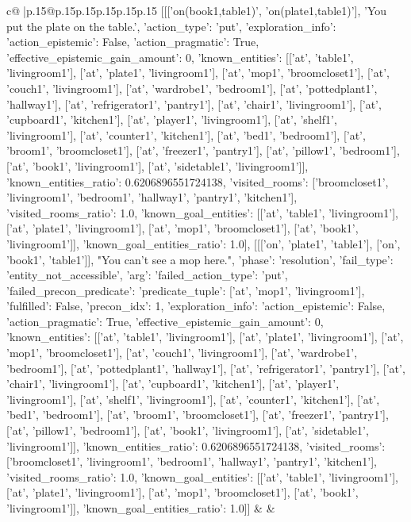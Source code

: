 \documentclass{article}
\begin{document}
{\begin{supertabular}{c@{$\;$}|p{.15\linewidth}@{}p{.15\linewidth}p{.15\linewidth}p{.15\linewidth}p{.15\linewidth}p{.15\linewidth}}
{{{	 [[['on(book1,table1)', 'on(plate1,table1)'], 'You put the plate on the table.', {'action_type': 'put', 'exploration_info': {'action_epistemic': False, 'action_pragmatic': True, 'effective_epistemic_gain_amount': 0, 'known_entities': [['at', 'table1', 'livingroom1'], ['at', 'plate1', 'livingroom1'], ['at', 'mop1', 'broomcloset1'], ['at', 'couch1', 'livingroom1'], ['at', 'wardrobe1', 'bedroom1'], ['at', 'pottedplant1', 'hallway1'], ['at', 'refrigerator1', 'pantry1'], ['at', 'chair1', 'livingroom1'], ['at', 'cupboard1', 'kitchen1'], ['at', 'player1', 'livingroom1'], ['at', 'shelf1', 'livingroom1'], ['at', 'counter1', 'kitchen1'], ['at', 'bed1', 'bedroom1'], ['at', 'broom1', 'broomcloset1'], ['at', 'freezer1', 'pantry1'], ['at', 'pillow1', 'bedroom1'], ['at', 'book1', 'livingroom1'], ['at', 'sidetable1', 'livingroom1']], 'known_entities_ratio': 0.6206896551724138, 'visited_rooms': ['broomcloset1', 'livingroom1', 'bedroom1', 'hallway1', 'pantry1', 'kitchen1'], 'visited_rooms_ratio': 1.0, 'known_goal_entities': [['at', 'table1', 'livingroom1'], ['at', 'plate1', 'livingroom1'], ['at', 'mop1', 'broomcloset1'], ['at', 'book1', 'livingroom1']], 'known_goal_entities_ratio': 1.0}}], [[['on', 'plate1', 'table1'], ['on', 'book1', 'table1']], "You can't see a mop here.", {'phase': 'resolution', 'fail_type': 'entity_not_accessible', 'arg': {'failed_action_type': 'put', 'failed_precon_predicate': {'predicate_tuple': ['at', 'mop1', 'livingroom1'], 'fulfilled': False, 'precon_idx': 1}}, 'exploration_info': {'action_epistemic': False, 'action_pragmatic': True, 'effective_epistemic_gain_amount': 0, 'known_entities': [['at', 'table1', 'livingroom1'], ['at', 'plate1', 'livingroom1'], ['at', 'mop1', 'broomcloset1'], ['at', 'couch1', 'livingroom1'], ['at', 'wardrobe1', 'bedroom1'], ['at', 'pottedplant1', 'hallway1'], ['at', 'refrigerator1', 'pantry1'], ['at', 'chair1', 'livingroom1'], ['at', 'cupboard1', 'kitchen1'], ['at', 'player1', 'livingroom1'], ['at', 'shelf1', 'livingroom1'], ['at', 'counter1', 'kitchen1'], ['at', 'bed1', 'bedroom1'], ['at', 'broom1', 'broomcloset1'], ['at', 'freezer1', 'pantry1'], ['at', 'pillow1', 'bedroom1'], ['at', 'book1', 'livingroom1'], ['at', 'sidetable1', 'livingroom1']], 'known_entities_ratio': 0.6206896551724138, 'visited_rooms': ['broomcloset1', 'livingroom1', 'bedroom1', 'hallway1', 'pantry1', 'kitchen1'], 'visited_rooms_ratio': 1.0, 'known_goal_entities': [['at', 'table1', 'livingroom1'], ['at', 'plate1', 'livingroom1'], ['at', 'mop1', 'broomcloset1'], ['at', 'book1', 'livingroom1']], 'known_goal_entities_ratio': 1.0}}]] 
	  } 
	   } 
	   } 
	 & & \\ 
 


\end{supertabular}}
\end{document}
